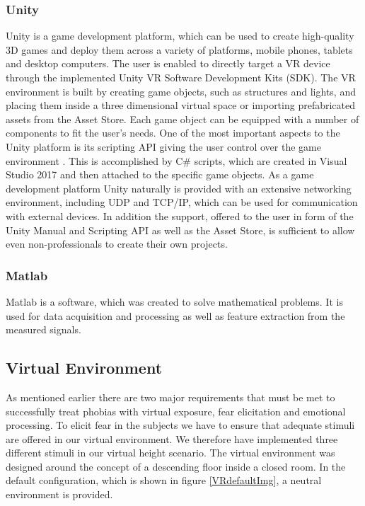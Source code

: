 \subsubsection{Unity}
Unity is a game development platform, which can be used to create high-quality 3D games and deploy them across a variety of platforms, mobile phones, tablets and desktop computers. The user is enabled to directly target a VR device through the implemented Unity VR Software Development Kits (SDK). The VR environment is built by creating game objects, such as structures and lights, and placing them inside a three dimensional virtual space or importing prefabricated assets from the Asset Store. Each game object can be equipped with a number of components to fit the user's needs. One of the most important aspects to the Unity platform is its scripting API giving the user control over the game environment . This is accomplished by C\# scripts, which are created in Visual Studio 2017 and then attached to the  specific game objects. As a game development platform Unity naturally is provided with an extensive networking environment, including UDP and TCP/IP, which can be used for communication with external devices. In addition the support, offered to the user in form of the Unity Manual and Scripting API as well as the Asset Store, is sufficient to allow even non-professionals to create their own projects.

\subsubsection{Matlab}
Matlab is a software, which was created to solve mathematical problems. It is used for data acquisition and processing as well as feature extraction from the measured signals.

\subsection{Virtual Environment}
As mentioned earlier there are two major requirements that must be met to successfully treat phobias with virtual exposure, fear elicitation and emotional processing. To elicit fear in the subjects we have to ensure that adequate stimuli are offered in our virtual environment. We therefore have implemented three different stimuli in our virtual height scenario. The virtual environment was designed around the concept of a descending floor inside a closed room. In the default configuration, which is shown in figure \ref{VRdefaultImg}, a neutral environment is provided.

